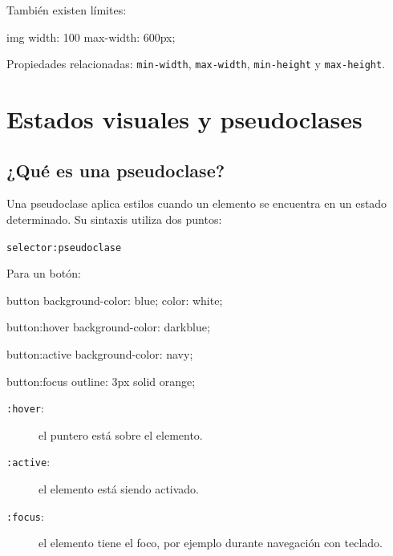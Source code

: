 \documentclass[11pt]{article}
\begin{document}
    También existen límites:

    \begin{csscodedark}
        img {
            width: 100%
            max-width: 600px;
        }
    \end{csscodedark}

    Propiedades relacionadas: \texttt{min-width}, \texttt{max-width}, \texttt{min-height} y \texttt{max-height}.

    \section{Estados visuales y pseudoclases}

    \subsection{¿Qué es una pseudoclase?}

    Una pseudoclase aplica estilos cuando un elemento se encuentra en un estado determinado. Su sintaxis utiliza dos puntos:

    \begin{center}
        \texttt{selector:pseudoclase}
    \end{center}

    Para un botón:

    \begin{csscodedark}
        button {
            background-color: blue;
            color: white;
        }

        button:hover {
            background-color: darkblue;
        }

        button:active {
            background-color: navy;
        }

        button:focus {
            outline: 3px solid orange;
        }
    \end{csscodedark}

    \begin{description}
        \item[\texttt{:hover}:] el puntero está sobre el elemento.
        \item[\texttt{:active}:] el elemento está siendo activado.
        \item[\texttt{:focus}:] el elemento tiene el foco, por ejemplo durante navegación con teclado.
    \end{description}
\end{document}
